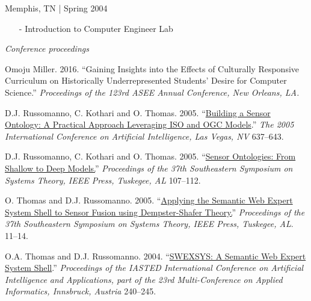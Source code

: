 \documentclass[11pt,article,oneside]{memoir}
\begin{document}
 \hfill Memphis, TN | Spring 2004
\begin{itemize}[noitemsep,nolistsep]
\item[-] Introduction to Computer Engineer Lab
\end{itemize}

\bigskip 


\medskip

\noindent\emph{Conference proceedings \vspace{0.05in}}


\ind Omoju Miller. 2016. ``Gaining Insights into the Effects of Culturally Responsive Curriculum on Historically Underrepresented Students' Desire for Computer Science.'' \emph{Proceedings of the 123rd ASEE Annual Conference, New Orleans, LA.}

\ind D.J. Russomanno, C. Kothari and O. Thomas. 2005. ``\href{https://scholar.google.com/citations?view_op=view_citation&hl=en&user=E7z_wrwAAAAJ&sortby=pubdate&citation_for_view=E7z_wrwAAAAJ:u5HHmVD_uO8C}{Building a Sensor Ontology: A Practical Approach Leveraging ISO and OGC Models}.'' \emph{The 2005 International Conference on Artificial Intelligence, Las Vegas, NV} 637--643.

\ind D.J. Russomanno, C. Kothari and O. Thomas. 2005. ``\href{http://scholar.google.com/citations?view_op=view_citation&hl=en&user=E7z_wrwAAAAJ&citation_for_view=E7z_wrwAAAAJ:u-x6o8ySG0sC}{Sensor Ontologies: From Shallow to Deep Models.}'' \emph{Proceedings of the 37th Southeastern Symposium on Systems Theory, IEEE Press, Tuskegee, AL} 107--112.

\ind O. Thomas and D.J. Russomanno. 2005. ``\href{http://scholar.google.com/citations?view_op=view_citation&hl=en&user=E7z_wrwAAAAJ&citation_for_view=E7z_wrwAAAAJ:d1gkVwhDpl0C}{Applying the Semantic Web Expert System Shell to Sensor Fusion using Dempster-Shafer Theory.}'' \emph{Proceedings of the 37th Southeastern Symposium on Systems Theory, IEEE Press, Tuskegee, AL}. 11--14.

\ind O.A. Thomas and D.J. Russomanno. 2004. ``\href{http://scholar.google.com/citations?view_op=view_citation&hl=en&user=E7z_wrwAAAAJ&citation_for_view=E7z_wrwAAAAJ:2osOgNQ5qMEC}{SWEXSYS: A Semantic Web Expert System Shell}.'' \emph{Proceedings of the IASTED International Conference on Artificial Intelligence and Applications, part of the 23rd Multi-Conference on Applied Informatics, Innsbruck, Austria} 240--245.
\end{document}
